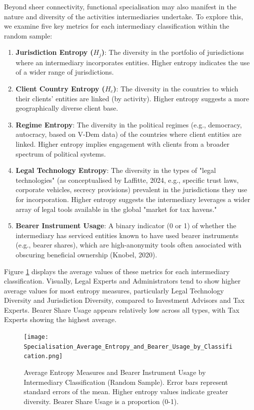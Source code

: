 Beyond sheer connectivity, functional specialisation may also manifest in the nature and diversity of the activities intermediaries undertake. To explore this, we examine five key metrics for each intermediary classification within the random sample:
\begin{enumerate}
    \item \textbf{Jurisdiction Entropy ($H_j$)}: The diversity in the portfolio of jurisdictions where an intermediary incorporates entities. Higher entropy indicates the use of a wider range of jurisdictions.
    \item \textbf{Client Country Entropy ($H_c$)}: The diversity in the countries to which their clients' entities are linked (by activity). Higher entropy suggests a more geographically diverse client base.
    \item \textbf{Regime Entropy}: The diversity in the political regimes (e.g., democracy, autocracy, based on V-Dem data) of the countries where client entities are linked. Higher entropy implies engagement with clients from a broader spectrum of political systems.
    \item \textbf{Legal Technology Entropy}: The diversity in the types of "legal technologies" (as conceptualised by Laffitte, 2024, e.g., specific trust laws, corporate vehicles, secrecy provisions) prevalent in the jurisdictions they use for incorporation. Higher entropy suggests the intermediary leverages a wider array of legal tools available in the global "market for tax havens."
    \item \textbf{Bearer Instrument Usage}: A binary indicator (0 or 1) of whether the intermediary has serviced entities known to have used bearer instruments (e.g., bearer shares), which are high-anonymity tools often associated with obscuring beneficial ownership (Knobel, 2020).
\end{enumerate}

Figure \ref{fig:specialisation_average_entropy_bearer} displays the average values of these metrics for each intermediary classification. Visually, Legal Experts and Administrators tend to show higher average values for most entropy measures, particularly Legal Technology Diversity and Jurisdiction Diversity, compared to Investment Advisors and Tax Experts. Bearer Share Usage appears relatively low across all types, with Tax Experts showing the highest average.

\begin{figure}[htbp]
    \centering
    \texttt{[image: Specialisation\_Average\_Entropy\_and\_Bearer\_Usage\_by\_Classification.png]}
    \caption{Average Entropy Measures and Bearer Instrument Usage by Intermediary Classification (Random Sample). Error bars represent standard errors of the mean. Higher entropy values indicate greater diversity. Bearer Share Usage is a proportion (0-1).}
    \label{fig:specialisation_average_entropy_bearer}
\end{figure}

